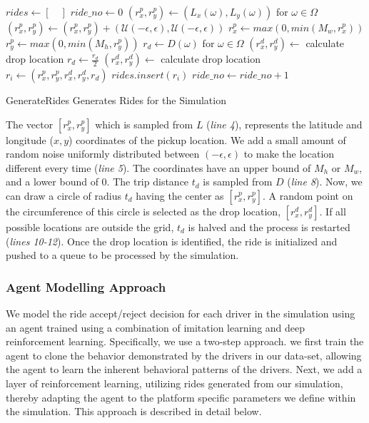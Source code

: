 \documentclass[runningheads]{llncs}
\begin{document}
\begin{algorithm}
\DontPrintSemicolon %
$rides \gets [\quad] $\;
$ride\_no \gets 0 $\;
 {
    $(r_x^p , r_y^p) \gets (L_x(\omega), L_y(\omega))$ for $\omega \in \Omega$\;
    $(r_x^p , r_y^p) \gets (r_x^p , r_y^p) + (\mathcal{U}(-\epsilon,\epsilon), \mathcal{U}(-\epsilon,\epsilon))$\;
    $r_x^p \gets max(0, min(M_w, r_x^p))$\;
    $r_y^p \gets max(0, min(M_h, r_y^p))$\;
    $r_d \gets D(\omega)$ for $\omega \in \Omega$\;
    $(r_x^d , r_y^d) \gets $ calculate drop location \;
     {
        $r_d \gets \frac{r_d}{2}$\;    
        $(r_x^d , r_y^d) \gets $ calculate drop location \;
    }
    $r_i \gets (r_x^p , r_y^p, r_x^d , r_y^d, r_d)$\;
    $rides.insert(r_i)$\;
    $ride\_no \gets ride\_no + 1$\;
}
\;
\caption{{\sc GenerateRides} Generates Rides for the Simulation }
\label{algo:GenerateRides}
\end{algorithm}

The vector \([r_x^p, r_y^p]\) which is sampled from \(L\) (\textit{line 4}),  represents the latitude and longitude (\(x, y\)) coordinates of the pickup location. We add a small amount of random noise uniformly distributed between \((-\epsilon, \epsilon)\) to make the location different every time (\textit{line 5}). The coordinates have an upper bound of \(M_h\) or \(M_w\), and a lower bound of 0. The trip distance \(t_d\) is sampled from \(D\) (\textit{line 8}). Now, we can draw a circle of radius \(t_d\) having the center as \([r_x^p, r_y^p]\). A random point on the circumference of this circle is selected as the drop location, \([r_x^d, r_y^d]\). If all possible locations are outside the grid, \(t_d\) is halved and the process is restarted (\textit{lines 10-12}). Once the drop location is identified, the ride is initialized and pushed to a queue to be processed by the simulation.


\subsubsection{Agent Modelling Approach}

We model the ride accept/reject decision for each driver in the simulation using an agent trained using a combination of imitation learning and deep reinforcement learning. Specifically, we use a two-step approach. we first train the agent to clone the behavior demonstrated by the drivers in our data-set, allowing the agent to learn the inherent behavioral patterns of the drivers. Next, we add a layer of reinforcement learning, utilizing rides generated from our simulation, thereby adapting the agent to the platform specific parameters we define within the simulation. This approach is described in detail below.
\end{document}
